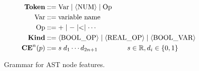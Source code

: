 \begin{figure}
  \centering
  \begin{align*}
    \textbf{Token}  &::= \text{Var} \mid \langle \text{NUM} \rangle \mid \text{Op}\\
    \text{Var} &::= \text{variable name}\\
    \text{Op} &::= + \mid - \mid < \mid \cdots\\
                                   \textbf{Kind} &::= \langle \text{BOOL\_OP} \rangle \mid \langle \text{REAL\_OP} \rangle \mid \langle \text{BOOL\_VAR} \rangle \\
    \textbf{CE}^{n}(p) &::= s\; d_1 \cdots d_{2n+1} \hspace{1.5cm} s \in \mathbb{R}, d_i \in \{0, 1\}
  \end{align*}
  \caption{Grammar for AST node features.}
  \label{fig:features}
\end{figure}


